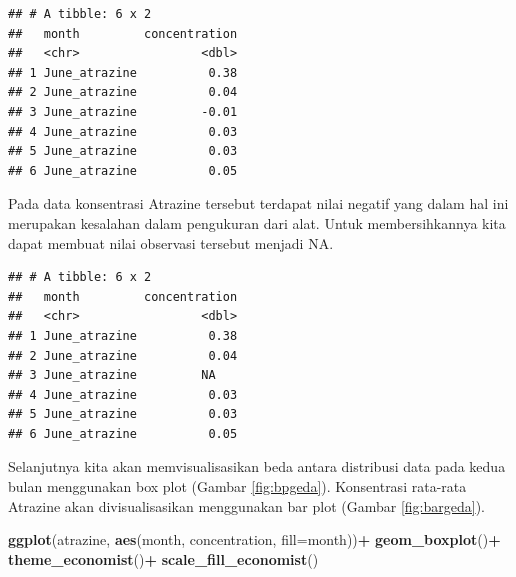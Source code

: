 \documentclass[]{book}
\newenvironment{Shaded}{\begin{snugshade}}{\end{snugshade}}
\newcommand{\KeywordTok}[1]{\textcolor[rgb]{0.13,0.29,0.53}{\textbf{#1}}}
\newcommand{\DataTypeTok}[1]{\textcolor[rgb]{0.13,0.29,0.53}{#1}}
\newcommand{\DecValTok}[1]{\textcolor[rgb]{0.00,0.00,0.81}{#1}}
\newcommand{\StringTok}[1]{\textcolor[rgb]{0.31,0.60,0.02}{#1}}
\newcommand{\OtherTok}[1]{\textcolor[rgb]{0.56,0.35,0.01}{#1}}
\newcommand{\OperatorTok}[1]{\textcolor[rgb]{0.81,0.36,0.00}{\textbf{#1}}}
\newcommand{\NormalTok}[1]{#1}
\begin{document}
\begin{verbatim}
## # A tibble: 6 x 2
##   month         concentration
##   <chr>                 <dbl>
## 1 June_atrazine          0.38
## 2 June_atrazine          0.04
## 3 June_atrazine         -0.01
## 4 June_atrazine          0.03
## 5 June_atrazine          0.03
## 6 June_atrazine          0.05
\end{verbatim}

Pada data konsentrasi Atrazine tersebut terdapat nilai negatif yang
dalam hal ini merupakan kesalahan dalam pengukuran dari alat. Untuk
membersihkannya kita dapat membuat nilai observasi tersebut menjadi NA.

\begin{Shaded}
\end{Shaded}

\begin{verbatim}
## # A tibble: 6 x 2
##   month         concentration
##   <chr>                 <dbl>
## 1 June_atrazine          0.38
## 2 June_atrazine          0.04
## 3 June_atrazine         NA   
## 4 June_atrazine          0.03
## 5 June_atrazine          0.03
## 6 June_atrazine          0.05
\end{verbatim}

Selanjutnya kita akan memvisualisasikan beda antara distribusi data pada
kedua bulan menggunakan box plot (Gambar \ref{fig:bpgeda}). Konsentrasi
rata-rata Atrazine akan divisualisasikan menggunakan bar plot (Gambar
\ref{fig:bargeda}).

\begin{Shaded}
\begin{Highlighting}[]
\KeywordTok{ggplot}\NormalTok{(atrazine, }\KeywordTok{aes}\NormalTok{(month, concentration, }\DataTypeTok{fill=}\NormalTok{month))}\OperatorTok{+}
\StringTok{  }\KeywordTok{geom_boxplot}\NormalTok{()}\OperatorTok{+}
\StringTok{  }\KeywordTok{theme_economist}\NormalTok{()}\OperatorTok{+}
\StringTok{  }\KeywordTok{scale_fill_economist}\NormalTok{()}
\end{Highlighting}
\end{Shaded}
\end{document}
